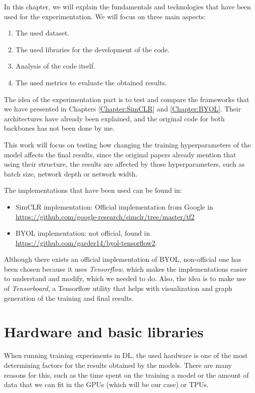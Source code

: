 In this chapter, we will explain the fundamentals and technologies that have been used for the experimentation. We will focus on three main aspects:
\begin{enumerate}
\item The used dataset.
\item The used libraries for the development of the code.
\item Analysis of the code itself.
\item The used metrics to evaluate the obtained results.
\end{enumerate}

The idea of the experimentation part is to test and compare the frameworks that we have presented in Chapters \ref{Chapter:SimCLR} and \ref{Chapter:BYOL}. Their architectures have already been explained, and the original code for both backbones has not been done by me. 

This work will focus on testing how changing the training hyperparameters of the model affects the final results, since the original papers \cite{chen_simple_2020,grill2020bootstrap} already mention that using their structure, the results are affected by those hyperparameters, such as batch size, network depth or network width.

The implementations that have been used can be found in:
\begin{itemize}
\item SimCLR implementation: Official implementation from Google in \url{https://github.com/google-research/simclr/tree/master/tf2}

\item BYOL implementation: not official, found in \url{https://github.com/garder14/byol-tensorflow2}. 
\end{itemize}

Although there exists an official implementation of BYOL, non-official one has been chosen because it uses \emph{Tensorflow}, which makes the implementations easier to understand and modify, which we needed to do. Also, the idea is to make use of \emph{Tensorboard}, a Tensorflow utility that helps with visualization and graph generation of the training and final results.


\section{Hardware and basic libraries}

When running training experiments in DL, the used hardware is one of the most determining factors for the results obtained by the models. There are many reasons for this, such as the time spent on the training a model or the amount of  data that we can fit in the GPUs (which will be our case) or TPUs.

